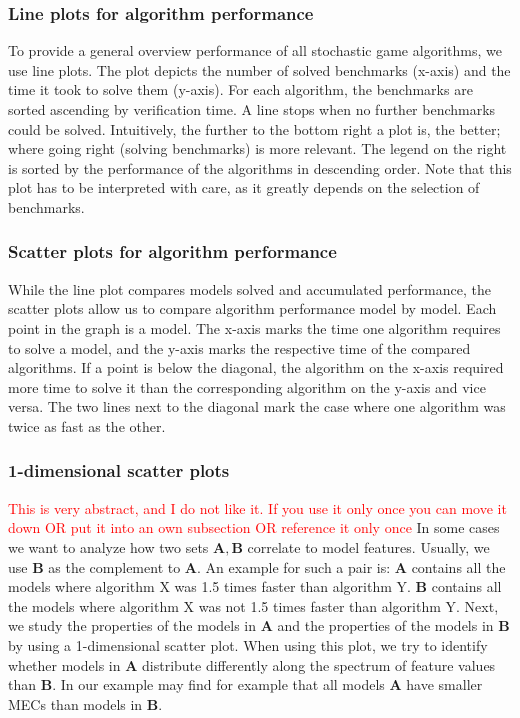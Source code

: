 \subsubsection*{Line plots for algorithm performance} \label{plot:starplot}
To provide a general overview performance of all stochastic game algorithms, we use line plots.
The plot depicts the number of solved benchmarks (x-axis) and the time it took to solve them (y-axis). 
For each algorithm, the benchmarks are sorted ascending by verification time. A line stops when no further benchmarks could be solved.
Intuitively, the further to the bottom right a plot is, the better; where going right (solving benchmarks) is more relevant.
The legend on the right is sorted by the performance of the algorithms in descending order.
Note that this plot has to be interpreted with care, as it greatly depends on the selection of benchmarks.

\subsubsection*{Scatter plots for algorithm performance} \label{plot:performanceScatter}
While the line plot compares models solved and accumulated performance, the scatter plots allow us to compare algorithm performance model by model.
Each point in the graph is a model. The x-axis marks the time one algorithm requires to solve a model, and the y-axis marks the respective time of the compared algorithms.
If a point is below the diagonal, the algorithm on the x-axis required more time to solve it than the corresponding algorithm on the y-axis and vice versa.
The two lines next to the diagonal mark the case where one algorithm was twice as fast as the other.

\subsubsection*{1-dimensional scatter plots} \label{plot:1Dscatter}
\textcolor{red}{This is very abstract, and I do not like it. If you use it only once you can move it down OR put it into an own subsection OR reference it only once}
In some cases we want to analyze how two sets $\mathbf{A}, \mathbf{B}$ correlate to model features. 
Usually, we use $\mathbf{B}$ as the complement to $\mathbf{A}$.
An example for such a pair is: 
$\mathbf{A}$ contains all the models where algorithm X was 1.5 times faster than algorithm Y.
$\mathbf{B}$ contains all the models where algorithm X was not 1.5 times faster than algorithm Y.
Next, we study the properties of the models in $\mathbf{A}$ and the properties of the models in $\mathbf{B}$ 
by using a 1-dimensional scatter plot. When using this plot, we try to identify whether models in $\mathbf{A}$ distribute
differently along the spectrum of feature values than $\mathbf{B}$.
In our example may find for example that all models $\mathbf{A}$ have smaller MECs than models in $\mathbf{B}$. 

